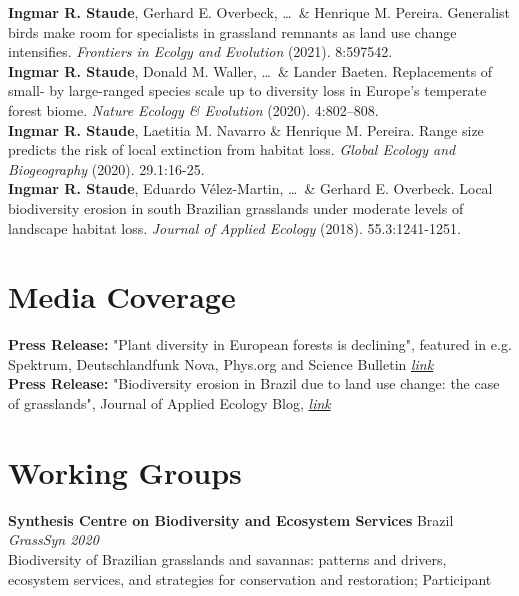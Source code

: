 \documentclass[a4paper,11pt]{article} %
\begin{document}
\textbf{Ingmar R. Staude}, Gerhard E. Overbeck, \ldots\ \& Henrique M. Pereira. Generalist birds make room for specialists in grassland remnants as land use change intensifies. \textit{Frontiers in Ecolgy and Evolution} (2021). 8:597542.\\

\textbf{Ingmar R. Staude}, Donald M. Waller, \ldots\ \& Lander Baeten. Replacements of small- by large-ranged species scale up to diversity loss in Europe's temperate forest biome. \textit{Nature Ecology \& Evolution} (2020). 4:802–808.\\

\textbf{Ingmar R. Staude}, Laetitia M. Navarro \& Henrique M. Pereira. Range size predicts the risk of local extinction from habitat loss. \textit{Global Ecology and Biogeography} (2020). 29.1:16-25.\\

\textbf{Ingmar R. Staude}, Eduardo Vélez-Martin, \ldots\ \& Gerhard E. Overbeck. Local biodiversity erosion in south Brazilian grasslands under moderate levels of landscape habitat loss. \textit{Journal of Applied Ecology} (2018). 55.3:1241-1251.\\


\section{Media Coverage}
\textbf{Press Release:} "Plant diversity in European forests is declining", featured in e.g. Spektrum, Deutschlandfunk Nova, Phys.org and Science Bulletin \href{https://www.nature.com/articles/s41559-020-1176-8/metrics}{\textit{link}}\\
\textbf{Press Release:} "Biodiversity erosion in Brazil due to land use change: the case of grasslands",
Journal of Applied Ecology Blog, \href{https://appliedecologistsblog.com/2018/01/31/biodiversity-erosion-in-brazil-due-to-land-use-change-the-case-of-grasslands/}{\textit{link}}\\

\section{Working Groups}
\normalsize\textbf{Synthesis Centre on Biodiversity and Ecosystem Services} \hfill Brazil \\
\textit{GrassSyn \hfill 2020}\\
\small{Biodiversity of Brazilian grasslands and savannas: patterns and
drivers, ecosystem services, and strategies for conservation and restoration; Participant}\normalsize \\
\end{document}
